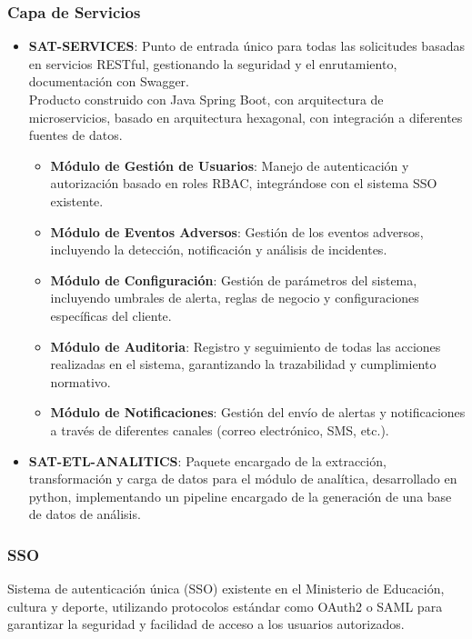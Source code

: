\subsubsection{Capa de Servicios}
\begin{itemize}
    \item \textbf{SAT-SERVICES}: Punto de entrada único para todas las solicitudes basadas en servicios RESTful, gestionando la seguridad y el enrutamiento, documentación con Swagger.\\
    Producto construido con Java Spring Boot, con arquitectura de microservicios, basado en arquitectura hexagonal, con integración a diferentes fuentes de datos.
    \begin{itemize}
        \item \textbf{Módulo de Gestión de Usuarios}: Manejo de autenticación y autorización basado en roles RBAC, integrándose con el sistema SSO existente.
        \item \textbf{Módulo de Eventos Adversos}: Gestión de los eventos adversos, incluyendo la detección, notificación y análisis de incidentes.
        \item \textbf{Módulo de Configuración}: Gestión de parámetros del sistema, incluyendo umbrales de alerta, reglas de negocio y configuraciones específicas del cliente.
        \item \textbf{Módulo de Auditoria}: Registro y seguimiento de todas las acciones realizadas en el sistema, garantizando la trazabilidad y cumplimiento normativo.
        \item \textbf{Módulo de Notificaciones}: Gestión del envío de alertas y notificaciones a través de diferentes canales (correo electrónico, SMS, etc.).
    \end{itemize}
    \item \textbf{SAT-ETL-ANALITICS}: Paquete encargado de la extracción, transformación y carga de datos para el módulo de analítica, desarrollado en python, implementando un pipeline encargado de la generación de una base de datos de análisis.
\end{itemize}

\subsubsection{SSO}
Sistema de autenticación única (SSO) existente en el Ministerio de Educación, cultura y deporte, utilizando protocolos estándar como OAuth2 o SAML para garantizar la seguridad y facilidad de acceso a los usuarios autorizados.

